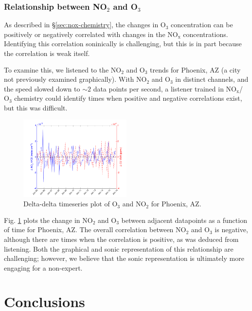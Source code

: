 \documentclass[a4paper,10pt,oneside]{article}
\newcommand{\ce}[1]{$\mathrm{#1}$}
\begin{document}
\begin{sloppy}
\subsubsection{Relationship between NO$_2$ and O$_3$}

	As described in \S\ref{sec:nox-chemistry}, the changes in \ce{O_3} concentration can be positively or negatively correlated with changes in the \ce{NO_x} concentrations. Identifying this correlation soninically is challenging, but this is in part because the correlation is weak itself.
	
	To examine this, we listened to the \ce{NO_2} and \ce{O_3} trends for Phoenix, AZ (a city not previously examined graphically). With \ce{NO_2} and \ce{O_3} in distinct channels, and the speed slowed down to $\sim 2$ data points per second, a listener trained in \ce{NO_x}/\ce{O_3} chemistry could identify times when positive and negative correlations exist, but this was difficult.
	
	\begin{figure}
	\centering
	\includegraphics[width=0.5\textwidth]{figs/delta-delta-timeser-phoenix_AZ.png} 
	\caption{Delta-delta timeseries plot of \ce{O_3} and \ce{NO_2} for Phoenix, AZ.}
	\label{fig:del-del}
	\end{figure}
	
	Fig. \ref{fig:del-del} plots the change in \ce{NO_2} and \ce{O_3} between adjacent datapoints as a function of time for Phoenix, AZ. The overall correlation between \ce{NO_2} and \ce{O_3} is negative, although there are times when the correlation is positive, as was deduced from listening. Both the graphical and sonic representation of this relationship are challenging; however, we believe that the sonic representation is ultimately more engaging for a non-expert.

\section{Conclusions}





\end{sloppy}
\end{document}
